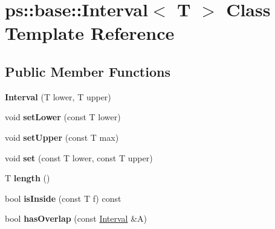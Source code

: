 \hypertarget{classps_1_1base_1_1Interval}{}\section{ps\+:\+:base\+:\+:Interval$<$ T $>$ Class Template Reference}
\label{classps_1_1base_1_1Interval}
\subsection*{Public Member Functions}
\begin{DoxyCompactItemize}
\item 
\hypertarget{classps_1_1base_1_1Interval_ad4b7aefdfd6b9fd8e8e98f175c82ecd0}{}{\bfseries Interval} (T lower, T upper)\label{classps_1_1base_1_1Interval_ad4b7aefdfd6b9fd8e8e98f175c82ecd0}

\item 
\hypertarget{classps_1_1base_1_1Interval_ab2b9a5655a0aa354dbe7c55ee2adc15d}{}void {\bfseries set\+Lower} (const T lower)\label{classps_1_1base_1_1Interval_ab2b9a5655a0aa354dbe7c55ee2adc15d}

\item 
\hypertarget{classps_1_1base_1_1Interval_af04e654d702f2531019024cf9e410b19}{}void {\bfseries set\+Upper} (const T max)\label{classps_1_1base_1_1Interval_af04e654d702f2531019024cf9e410b19}

\item 
\hypertarget{classps_1_1base_1_1Interval_aeb910ce8b3963e07b9e8807940c68022}{}void {\bfseries set} (const T lower, const T upper)\label{classps_1_1base_1_1Interval_aeb910ce8b3963e07b9e8807940c68022}

\item 
\hypertarget{classps_1_1base_1_1Interval_a66fd69b59a77932b00749d8fa96d38f5}{}T {\bfseries length} ()\label{classps_1_1base_1_1Interval_a66fd69b59a77932b00749d8fa96d38f5}

\item 
\hypertarget{classps_1_1base_1_1Interval_a4199e8ca7f85f5147e778c14b1ae84ad}{}bool {\bfseries is\+Inside} (const T f) const \label{classps_1_1base_1_1Interval_a4199e8ca7f85f5147e778c14b1ae84ad}

\item 
\hypertarget{classps_1_1base_1_1Interval_abc4d50fdaf660298559a9d2f3fe18db4}{}bool {\bfseries has\+Overlap} (const \hyperlink{classps_1_1base_1_1Interval}{Interval} \&A)\label{classps_1_1base_1_1Interval_abc4d50fdaf660298559a9d2f3fe18db4}


\end{DoxyCompactItemize}

